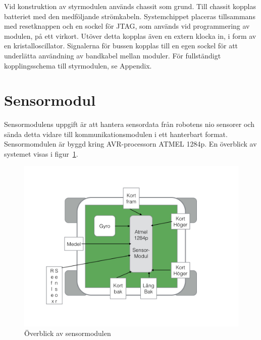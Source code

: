 \documentclass[a4paper,12pt,fleqn]{article}
\begin{document}
Vid konstruktion av styrmodulen används chassit som grund. Till chassit kopplas batteriet med den medföljande strömkabeln. Systemchippet placeras tillsammans med resetknappen och en sockel för JTAG, som används vid programmering av modulen, på ett virkort. Utöver detta kopplas även en extern klocka in, i form av en kristalloscillator. Signalerna för bussen kopplas till en egen sockel för att underlätta användning av bandkabel mellan moduler. För fullständigt kopplingsschema till styrmodulen, se Appendix. 

\newpage



\section{Sensormodul}
Sensormodulens uppgift är att hantera sensordata från robotens nio sensorer och sända detta vidare till kommunikationsmodulen i ett hanterbart format. Sensormomdulen är byggd kring AVR-processorn ATMEL 1284p. En överblick av systemet visas i figur~\ref{fig:sensoroverview}.

\begin{figure}[htp] %
  \begin{center}
  \includegraphics[keepaspectratio=true,width=\linewidth]{bilder/overblicksensor}  %
  \end{center}
  \caption{Överblick av sensormodulen} %
  \label{fig:sensoroverview}
\end{figure}
\end{document}
